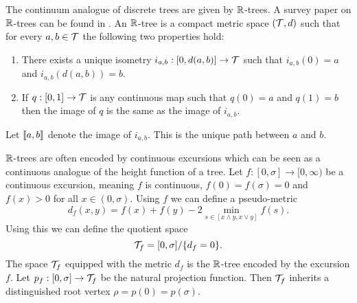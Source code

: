 The continuum analogue of discrete trees are given by ${\mathbb R}$-trees. A survey paper on ${\mathbb R}$-trees can be found in \cite{Legall2005}. An ${\mathbb R}$-tree is a compact metric space $({\mathcal T}, d)$ such that for every $a, b \in {\mathcal T}$ the following two properties hold:
\begin{enumerate}
    \item There exists a unique isometry $i_{a, b} : [0, d(a, b)] \to {\mathcal T}$ such that $i_{a, b}(0) = a$ and $i_{a, b}(d(a, b)) = b$.
    \item If $q: [0, 1] \to {\mathcal T}$ is any continuous map such that $q(0) = a$ and $q(1) = b$ then the image of $q$ is the same as the image of $i_{a, b}$.
\end{enumerate}
Let $\llbracket a, b\rrbracket$ denote the image of $i_{a, b}$. This is the unique path between $a$ and $b$.

${\mathbb R}$-trees are often encoded by continuous excursions which can be seen as a continuous analogue of the height function of a tree. Let $f: [0, \sigma] \to [0, \infty)$ be a continuous excursion, meaning $f$ is continuous, $f(0) = f(\sigma) = 0$ and $f(x) > 0$ for all $x \in (0, \sigma)$. Using $f$ we can define a pseudo-metric
\begin{equation*}
    d_f(x, y) = f(x) + f(y) - 2 \min_{s \in [x \wedge y, x \vee y]} f(s).
\end{equation*}
Using this we can define the quotient space
\begin{equation*}
    {\mathcal T}_f = [0, \sigma] / \{d_f = 0\}.
\end{equation*}
The space ${\mathcal T}_f$ equipped with the metric $d_f$ is the ${\mathbb R}$-tree encoded by the excursion $f$. Let $p_f: [0, \sigma] \to {\mathcal T}_f$ be the natural projection function. Then ${\mathcal T}_f$ inherits a distinguished root vertex $\rho = p(0) = p(\sigma)$.